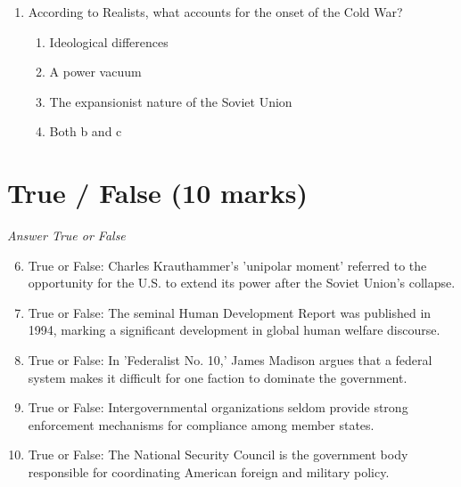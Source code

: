 \documentclass[12pt]{article}
\begin{document}
\begin{enumerate}[label=\arabic*.]
\begin{enumerate}[label=(\alph*)]
    \item Having the capability to deter the most powerful rival
    \item Having the capability to deter smaller states
    \item How nuclear attacks are identified and responded to; who controls the weapons
    \item Bureaucratic politics provides no information about nuclear proliferation and use
\end{enumerate}
\item According to Realists, what accounts for the onset of the Cold War?
\begin{enumerate}[label=(\alph*)]
    \item Ideological differences
    \item A power vacuum
    \item The expansionist nature of the Soviet Union
    \item Both b and c
\end{enumerate}
\end{enumerate}

\section*{True / False (10 marks)}
\textit{Answer True or False}
\begin{enumerate}[label=\arabic*.]
\setcounter{enumi}{5}
\item True or False: Charles Krauthammer's 'unipolar moment' referred to the opportunity for the U.S. to extend its power after the Soviet Union's collapse.
\item True or False: The seminal Human Development Report was published in 1994, marking a significant development in global human welfare discourse.
\item True or False: In 'Federalist No. 10,' James Madison argues that a federal system makes it difficult for one faction to dominate the government.
\item True or False: Intergovernmental organizations seldom provide strong enforcement mechanisms for compliance among member states.
\item True or False: The National Security Council is the government body responsible for coordinating American foreign and military policy.
\end{enumerate}
\end{document}
